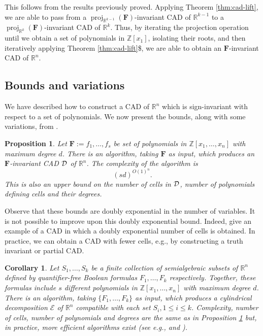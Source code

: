 \documentclass[
]{book}
\newtheorem{corollary}{Corollary}[chapter]
\newtheorem{proposition}{Proposition}[chapter]
\theoremstyle{definition}
\theoremstyle{definition}
\theoremstyle{definition}
\theoremstyle{definition}
\theoremstyle{remark}
\begin{document}
This follows from the results previously proved. Applying Theorem \ref{thm:cad-lift}, we are able to pass from a \({\operatorname{proj}_{\mathbb{R}^{k-1}}}(\mathbf{F})\)-invariant CAD of \(\mathbb{R}^{k-1}\) to a \({\operatorname{proj}_{\mathbb{R}^{k}}}(\mathbf{F})\)-invariant CAD of \(\mathbb{R}^k\). Thus, by iterating the projection operation until we obtain a set of polynomials in \(\mathbb{Z}[x_1]\), isolating their roots, and then iteratively applying Theorem \ref{thm:cad-lift}\$, we are able to obtain an \(\mathbf{F}\)-invariant CAD of \(\mathbb{R}^n\).

\hypertarget{bounds-and-variations}{%
\subsection{Bounds and variations}\label{bounds-and-variations}}

We have described how to construct a CAD of \(\mathbb{R}^n\) which is sign-invariant with respect to a set of polynomials. We now
present the bounds, along with some variations, from \citet{bpr2006}.

\begin{proposition}
\protect\hypertarget{prp:collins}{}\label{prp:collins}\citep[Algorithm 11.2]{bpr2006}
Let \(\mathbf{F} := f_1,\ldots,f_s\) be set of polynomials in \(\mathbb{Z}[x_1, \ldots ,x_n]\) with maximum degree \(d\).
There is an algorithm, taking \(\mathbf{F}\) as input, which produces an \(\mathbf{F}\)-invariant CAD \(\cal D\) of \(\mathbb{R}^n\).
The complexity of the algorithm is
\[(sd)^{O(1)^{n}}.
\]
This is also an upper bound on the number of cells in \(\cal D\), number of polynomials defining cells and their degrees.
\end{proposition}

Observe that these bounds are doubly exponential in the number of variables. It is not possible to improve upon this doubly exponential bound.
Indeed, \citet{davenportHeintz1988} give an example of a CAD in which a doubly exponential number of cells is obtained. In practice, we can obtain a CAD with fewer cells, e.g., by constructing a truth invariant or partial CAD.

\begin{corollary}
\protect\hypertarget{cor:collins-sets}{}\label{cor:collins-sets}Let \(S_1,\ldots,S_k\) be a finite collection of semialgebraic subsets of \(\mathbb{R}^n\) defined by quantifier-free Boolean formulas \(F_1,\ldots,F_k\) respectively. Together, these formulas include \(s\) different polynomials in \(\mathbb{Z}[x_1,\ldots,x_n]\) with maximum degree \(d\).
There is an algorithm, taking \(\{F_1,\ldots,F_k\}\) as input, which produces a cylindrical decomposition \(\mathcal E\) of \(\mathbb{R}^n\) compatible with each set \(S_i, 1 \le i \le k\).
Complexity, number of cells, number of polynomials and degrees are the same as in Proposition \ref{prp:collins} but, in practice, more efficient algorithms exist (see e.g., \citet{collins1991} and \citet{bradford2014}).
\end{corollary}
\end{document}
